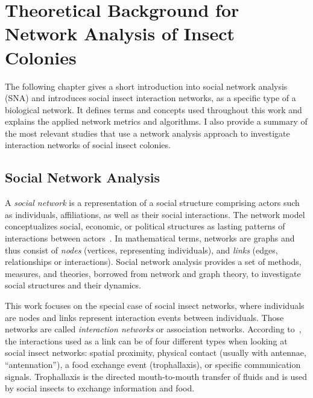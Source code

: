 \chapter{Theoretical Background for Network Analysis of Insect Colonies}
\label{ch:foundation}
The following chapter gives a short introduction into social network analysis (SNA) and introduces social insect interaction networks, as a specific type of a biological network. It defines terms and concepts used throughout this work and explains the applied network metrics and algorithms.
I also provide a summary of the most relevant studies that use a network analysis approach to investigate interaction networks of social insect colonies.

\section{Social Network Analysis}
\label{ch:bg}

A \emph{social network} is a representation of a social structure comprising actors such as individuals, affiliations, as well as their social interactions.
The network model conceptualizes social, economic, or political structures as lasting patterns of interactions between actors~\cite{wasserman1994social}.
In mathematical terms, networks are graphs and thus consist of \emph{nodes} (vertices, representing individuals), and \emph{links} (edges, relationships or interactions).
Social network analysis provides a set of methods, measures, and theories, borrowed from network and graph theory, to investigate social structures and their dynamics.

This work focuses on the special case of social insect networks, where individuals are nodes and links represent interaction events between individuals. Those networks are called \emph{interaction networks} or association networks.
According to~\textcite{charbonneau2013social}, the interactions used as a link can be of four different types when looking at social insect networks: spatial proximity, physical contact (usually with antennae, ``antennation''), a food exchange event (trophallaxis), or specific communication signals. Trophallaxis is the directed mouth-to-mouth transfer of fluids and is used by social insects to exchange information and food.

